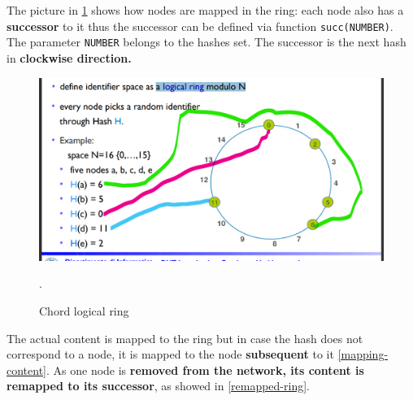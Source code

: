 \documentclass[10pt,a4paper]{report}
\begin{document}
The picture in \ref{ring-map} shows how nodes are mapped in the ring: each node also has a \textbf{successor} to it thus the successor can be defined via function \texttt{succ(NUMBER)}.  The parameter \texttt{NUMBER} belongs to the hashes set. The successor is the next hash in \textbf{clockwise direction.}
\begin{figure}
	\centering
	\includegraphics[scale=0.50]{images/Pasted image 20230303114227.png}
	\caption{Chord logical ring}
	\label{ring-map}.
\end{figure}


The actual content is mapped to the ring but in case the hash does not correspond to a node, it is mapped to the node \textbf{subsequent} to it \ref{mapping-content}. As one node is \textbf{removed from the network, its content is remapped to its successor}, as showed in \ref{remapped-ring}.
\end{document}
